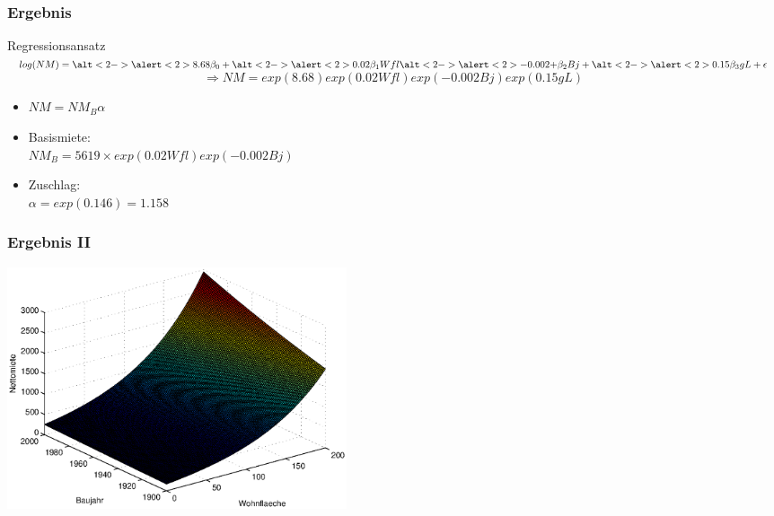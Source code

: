 \documentclass{beamer}
\begin{document}
\begin{frame}
  \frametitle{Ergebnis}
  \begin{block}{Regressionsansatz}
    \centering
    $ log(NM) = \alt<2->{\alert<2>{8.68}}{\beta_0} + \alt<2->{\alert<2>{0.02}}{\beta_1} Wfl \alt<2->{\alert<2>{- 0.002}}{+ \beta_2} Bj + \alt<2->{\alert<2>{0.15}}{\beta_3} gL + \epsilon $
      \pause\pause
    \[ \Rightarrow NM = exp(8.68) exp(0.02 Wfl) exp(-0.002 Bj) exp(0.15 gL) \]
        
  \end{block}

  \pause

  \begin{itemize}
  \item $NM = NM_B \alpha$
  \item Basismiete: \\
    $NM_B = 5619 \times exp(0.02 Wfl) exp(-0.002 Bj)$ \\
  \item Zuschlag: \\
    $\alpha = exp(0.146) = 1.158$ \\
  \end{itemize}
\end{frame}

\begin{frame}
  \frametitle{Ergebnis II}
  \begin{center}
    \includegraphics[width=10cm]{figures/nm_wfl_bj_log_approach}
  \end{center}

\end{frame}
\end{document}
